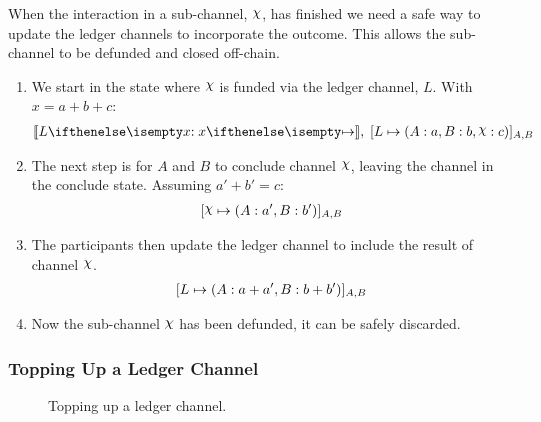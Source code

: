 When the interaction in a sub-channel, $\rchi$, has finished we need a safe way to update the ledger channels to incorporate the outcome.
This allows the sub-channel to be defunded and closed off-chain.
\begin{enumerate}
  \item We start in the state where $\rchi$ is funded via the ledger channel, $L$. With $x = a + b + c$:
  \begin{align}
    \adj{\holds{L}{x}{}}, \; \finalizable{L}{\alloc{A: a, B: b, \rchi: c}}{A, B}
  \end{align}
  \item The next step is for $A$ and $B$ to conclude channel $\rchi$, leaving the channel in the conclude state. Assuming $a' + b' = c$:
  \begin{align}
    \finalizable{\rchi}{\alloc{A:a', B:b'}}{A,B}
  \end{align}
  \item The participants then update the ledger channel to include the result of channel $\rchi$.
  \begin{align}
    [L \mapsto ( A: a+ a', B: b + b' )]_{A, B}
  \end{align}
  \item Now the sub-channel $\rchi$ has been defunded, it can be safely discarded.
\end{enumerate}

\subsubsection{Topping Up a Ledger Channel}

\begin{figure}[h]\centering
  \makebox[\textwidth][c]{}
  \caption{
    Topping up a ledger channel.
  }\label{fig:ledger-top-up}
\end{figure}

